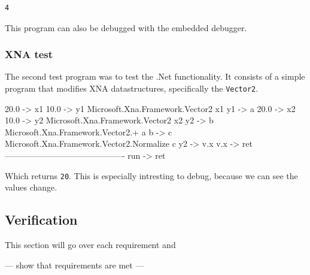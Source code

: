 \begin{lstlisting}
4
\end{lstlisting}

This program can also be debugged with the embedded debugger.

\subsubsection{XNA test}
The second test program was to test the .Net functionality.
It consists of a simple program that modifies XNA datastructures, specifically the \verb|Vector2|.

\begin{MC}
20.0 -> x1
10.0 -> y1
Microsoft.Xna.Framework.Vector2 x1 y1 -> a
20.0 -> x2
10.0 -> y2
Microsoft.Xna.Framework.Vector2 x2 y2 -> b
Microsoft.Xna.Framework.Vector2.+ a b -> c
Microsoft.Xna.Framework.Vector2.Normalize c
y2 -> v.x 
v.x -> ret
-------------------------------------------
run -> ret
\end{MC}

Which returns \verb|20|.
This is especially intresting to debug, because we can see the values change.


\subsection{Verification}
This section will go over each requirement and 

--- show that requirements are met ---

